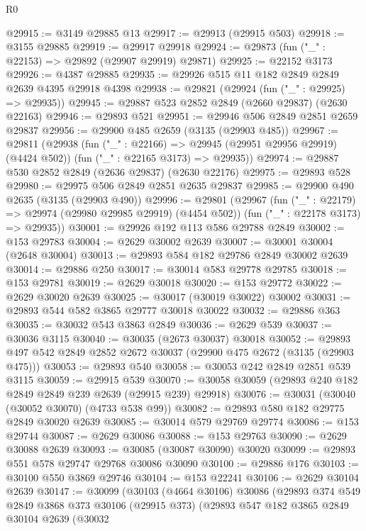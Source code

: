 \begin{lexlean}{R0}
\begin{coremodule}
@29915 := @3149 @29885 @13
@29917 := @29913 (@29915 @503)
@29918 := @3155 @29885
@29919 := @29917 @29918
@29924 := @29873 (fun ("_" : @22153) => @29892 (@29907 @29919) @29871)
@29925 := @22152 @3173
@29926 := @4387 @29885
@29935 := @29926 @515 @11 @182 @2849 @2849 @2639 @4395 @29918 @4398
@29938 := @29821 (@29924 (fun ("_" : @29925) => @29935))
@29945 := @29887 @523 @2852 @2849 (@2660 @29837) (@2630 @22163)
@29946 := @29893 @521
@29951 := @29946 @506 @2849 @2851 @2659 @29837
@29956 := @29900 @485 @2659 (@3135 (@29903 @485))
@29967 := @29811
    (@29938
      (fun ("_" : @22166) => @29945 (@29951 @29956 @29919) (@4424 @502))
      (fun ("_" : @22165 @3173) => @29935))
@29974 := @29887 @530 @2852 @2849 (@2636 @29837) (@2630 @22176)
@29975 := @29893 @528
@29980 := @29975 @506 @2849 @2851 @2635 @29837
@29985 := @29900 @490 @2635 (@3135 (@29903 @490))
@29996 := @29801
    (@29967
      (fun ("_" : @22179) => @29974 (@29980 @29985 @29919) (@4454 @502))
      (fun ("_" : @22178 @3173) => @29935))
@30001 := @29926 @192 @113 @586 @29788 @2849
@30002 := @153 @29783
@30004 := @2629 @30002 @2639
@30007 := @30001 @30004 (@2648 @30004)
@30013 := @29893 @584 @182 @29786 @2849 @30002 @2639
@30014 := @29886 @250
@30017 := @30014 @583 @29778 @29785
@30018 := @153 @29781
@30019 := @2629 @30018
@30020 := @153 @29772
@30022 := @2629 @30020 @2639
@30025 := @30017 (@30019 @30022) @30002
@30031 := @29893 @544 @582 @3865 @29777 @30018 @30022
@30032 := @29886 @363
@30035 := @30032 @543 @3863 @2849
@30036 := @2629 @539
@30037 := @30036 @3115
@30040 := @30035 (@2673 @30037) @30018
@30052 := @29893 @497 @542 @2849 @2852 @2672 @30037 (@29900 @475 @2672 (@3135 (@29903 @475)))
@30053 := @29893 @540
@30058 := @30053 @242 @2849 @2851 @539 @3115
@30059 := @29915 @539
@30070 := @30058 @30059 (@29893 @240 @182 @2849 @2849 @239 @2639 (@29915 @239) @29918)
@30076 := @30031 (@30040 (@30052 @30070) (@4733 @538 @99))
@30082 := @29893 @580 @182 @29775 @2849 @30020 @2639
@30085 := @30014 @579 @29769 @29774
@30086 := @153 @29744
@30087 := @2629 @30086
@30088 := @153 @29763
@30090 := @2629 @30088 @2639
@30093 := @30085 (@30087 @30090) @30020
@30099 := @29893 @551 @578 @29747 @29768 @30086 @30090
@30100 := @29886 @176
@30103 := @30100 @550 @3869 @29746
@30104 := @153 @22241
@30106 := @2629 @30104 @2639
@30147 := @30099
    (@30103
      (@4664 @30106)
      @30086
      (@29893
        @374
        @549
        @2849
        @3868
        @373
        @30106
        (@29915 @373)
        (@29893
          @547
          @182
          @3865
          @2849
          @30104
          @2639
          (@30032

\end{coremodule}
\end{lexlean}
